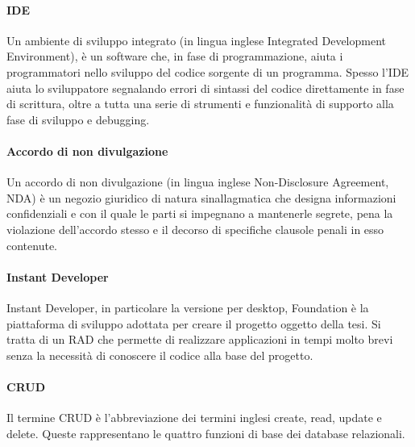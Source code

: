 \paragraph{IDE}
\label{IDE}
Un ambiente di sviluppo integrato (in lingua inglese Integrated Development Environment), è un software che, in fase di programmazione, aiuta i programmatori nello sviluppo del codice sorgente di un programma. 
Spesso l'IDE aiuta lo sviluppatore segnalando errori di sintassi del codice direttamente in fase di scrittura, oltre a tutta una serie di strumenti e funzionalità di supporto alla fase di sviluppo e debugging. \hyperref[bib11]{\cite{[16]}}

\paragraph{Accordo di non divulgazione}
\label{NDA}
Un accordo di non divulgazione (in lingua inglese Non-Disclosure Agreement, NDA) è un negozio giuridico di natura sinallagmatica che designa informazioni confidenziali e con il quale le parti si impegnano a mantenerle segrete, pena la violazione dell'accordo stesso e il decorso di specifiche clausole penali in esso contenute. \hyperref[bib13]{\cite{[13]}}

\paragraph{Instant Developer}
\label{InDe}
Instant Developer, in particolare la versione per desktop, Foundation è la piattaforma di sviluppo adottata per creare il progetto oggetto della tesi. Si tratta di un RAD che permette di realizzare applicazioni in tempi molto brevi senza la necessità di conoscere il codice alla base del progetto.

\paragraph{CRUD}
\label{CRUD}
Il termine CRUD è l'abbreviazione dei termini inglesi create, read, update e delete. Queste rappresentano le quattro funzioni di base dei database relazionali.
